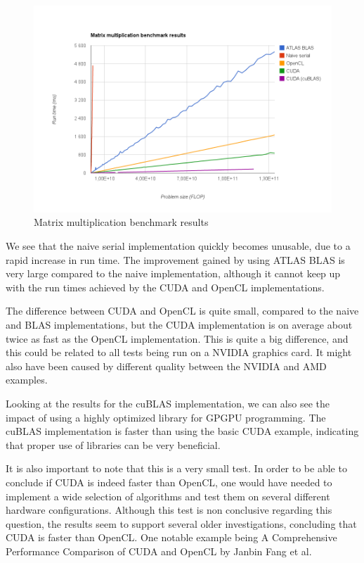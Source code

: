 \begin{figure}[ht!]
    \centering
    \includegraphics[width=120mm]{../gfx/matrix-multiplication-benchmark-results.png}
    \caption{Matrix multiplication benchmark results}
    \label{fig:matrix-multiplication-benchmark-results}
\end{figure}

We see that the naive serial implementation quickly becomes unusable, due to a rapid increase in run time. The improvement gained by using ATLAS BLAS is very large compared to the naive implementation, although it cannot keep up with the run times achieved by the CUDA and OpenCL implementations.

The difference between CUDA and OpenCL is quite small, compared to the naive and BLAS implementations, but the CUDA implementation is on average about twice as fast as the OpenCL implementation. This is quite a big difference, and this could be related to all tests being run on a NVIDIA graphics card. It might also have been caused by different quality between the NVIDIA and AMD examples.

Looking at the results for the cuBLAS implementation, we can also see the impact of using a highly optimized library for GPGPU programming. The cuBLAS implementation is faster than using the basic CUDA example, indicating that proper use of libraries can be very beneficial.

It is also important to note that this is a very small test. In order to be able to conclude if CUDA is indeed faster than OpenCL, one would have needed to implement a wide selection of algorithms and test them on several different hardware configurations. Although this test is non conclusive regarding this question, the results seem to support several older investigations, concluding that CUDA is faster than OpenCL\@. One notable example being A Comprehensive Performance Comparison of CUDA and OpenCL\cite{Fang11} by Janbin Fang et al.

